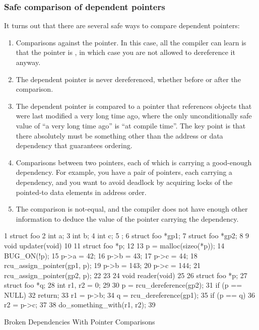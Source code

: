 \subsubsection{Safe comparison of dependent pointers}
It turns out that there are several safe ways to compare dependent
pointers:

\begin{enumerate}
\item	Comparisons against the  pointer.
	In this case, all the compiler can learn is that the pointer
	is , in which case you are not allowed to
	dereference it anyway.
\item	The dependent pointer is never dereferenced, whether before or
	after the comparison.
\item	The dependent pointer is compared to a pointer that references
	objects that were last modified a very long time ago, where
	the only unconditionally safe value of ``a very long time ago'' is
	``at compile time''.
	The key point is that there absolutely must be something other
	than the address or data dependency that guarantees ordering.
\item	Comparisons between two pointers, each of which is carrying
	a good-enough dependency.
	For example, you have a pair of pointers, each carrying a
	dependency, and you want to avoid deadlock by acquiring locks
	of the pointed-to data elements in address order.
\item	The comparison is not-equal, and the compiler does not have
	enough other information to deduce the value of the
	pointer carrying the dependency.
\end{enumerate}

\begin{listing}[tbp]
{ \scriptsize
\begin{verbbox}
 1 struct foo {
 2   int a;
 3   int b;
 4   int c;
 5 };
 6 struct foo *gp1;
 7 struct foo *gp2;
 8
 9 void updater(void)
10 {
11   struct foo *p;
12
13   p = malloc(sizeo(*p));
14   BUG_ON(!p);
15   p->a = 42;
16   p->b = 43;
17   p->c = 44;
18   rcu_assign_pointer(gp1, p);
19   p->b = 143;
20   p->c = 144;
21   rcu_assign_pointer(gp2, p);
22 }
23
24 void reader(void)
25 {
26   struct foo *p;
27   struct foo *q;
28   int r1, r2 = 0;
29
30   p = rcu_dereference(gp2);
31   if (p == NULL)
32     return;
33   r1 = p->b;
34   q = rcu_dereference(gp1);
35   if (p == q) {
36     r2 = p->c;
37   }
38   do_something_with(r1, r2);
39 }
\end{verbbox}
}
\centering
\theverbbox
\caption{Broken Dependencies With Pointer Comparisons}
\label{lst:memorder:Broken Dependencies With Pointer Comparisons}
\end{listing}

